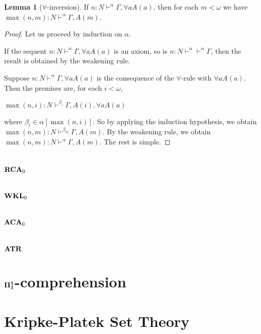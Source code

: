 \documentclass[8pt]{article}
\theoremstyle{definition}
\theoremstyle{definition}
\theoremstyle{definition}
\theoremstyle{definition}
\theoremstyle{definition}
\theoremstyle{definition}
\theoremstyle{definition}
\theoremstyle{definition}
\newtheorem{lemma}{Lemma}[section]
\theoremstyle{definition}
\theoremstyle{definition}
\theoremstyle{definition}
\theoremstyle{definition}
\theoremstyle{definition}
\theoremstyle{question}
\begin{document}
\begin{lemma}[$\forall$-inversion] If $n : N \vdash^{\alpha} \Gamma, \forall a A(a)$,
  then for each $m < \omega$ we have $\max(n, m) : N \vdash^{\alpha} \Gamma, A(m)$.
\end{lemma}

\begin{proof}
  Let us proceed by induction on $\alpha$.

  If the sequent $n : N \vdash^{\alpha} \Gamma, \forall a A(a)$ is an axiom, so is 
  $n : N \vdash^{\alpha} \vdash^{\alpha} \Gamma$, then the result is obtained by the weakening rule.

  Suppose $n : N \vdash^{\alpha} \Gamma, \forall a A(a)$ is the consequence of the $\forall$-rule
  with $\forall a A(a)$. Then the premises are, for each $i < \omega$,
  \begin{center}
    $\max(n, i) : N \vdash^{\beta_i} \Gamma, A(i), \forall a A(a)$
  \end{center}
  where $\beta_i \in \alpha[\max(n, i)]$.
  So by applying the induction hypothesis, we obtain $\max(n, m) : N \vdash^{\beta_m} \Gamma, A(m)$.
  By the weakening rule, we obtain $\max(n,m) : N \vdash^{\alpha} \Gamma, A(m)$.
  The rest is simple.
\end{proof}

\section{${\bf RCA}_0$}

\section{${\bf WKL}_0$}

\section{${\bf ACA}_0$}

\section{${\bf ATR}$}

\section{${\bf \Pi_1^1}$-comprehension}

\section{Kripke-Platek Set Theory}




\end{document}
